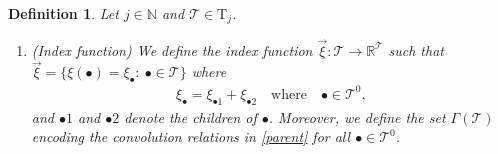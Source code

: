 \documentclass[%
11pt,  reqno]{amsart}
\newcommand{\5}{\textup{V}}
\newtheorem{definition}[theorem]{Definition}
\theoremstyle{remark}
\newcommand{\R}{\mathbb{R}}
\newcommand{\bul}{\bullet}
\newcommand{\TT}{\mathcal{T}}
\newcommand{\Tr}{\mathrm{T}}
\newcommand{\G}{\Gamma}
\newcommand{\N}{\mathbb{N}}
\numberwithin{equation}{section}
\numberwithin{theorem}{section}
\begin{document}
\begin{definition}\rm 

Let $j\in\N$ and $\TT \in \Tr_j$. 

\begin{enumerate}
\item[(i)] (Index function) 
We define the index function $\vec\xi : \TT\to \R^\TT$ such that $\vec\xi = \{\xi(\bul) = \xi_\bul: \ \bul \in \TT\}$ where
\begin{align}
\label{parent}
\xi_\bul = \xi_{\bul1} + \xi_{\bul2} \quad \text{where} \quad \bul\in \TT^0,
\end{align}
and $\bul1$ and $\bul2$ denote the children of $\bul$. Moreover, we define the set $\G(\TT)$ encoding the convolution relations in \eqref{parent} for all $\bul \in\TT^0$. 

\smallskip


\end{enumerate}
\end{definition}
\end{document}
